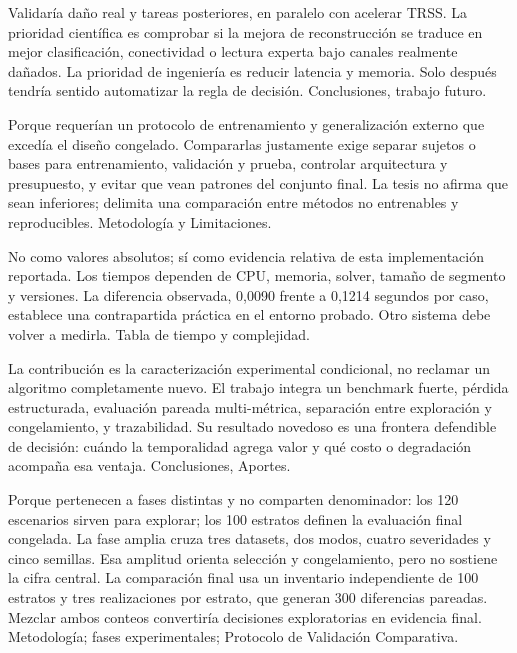 {Validaría daño real y tareas posteriores, en paralelo con acelerar TRSS.}
{La prioridad científica es comprobar si la mejora de reconstrucción se traduce en mejor clasificación, conectividad o lectura experta bajo canales realmente dañados. La prioridad de ingeniería es reducir latencia y memoria. Solo después tendría sentido automatizar la regla de decisión.}
{Conclusiones, trabajo futuro.}

{Porque requerían un protocolo de entrenamiento y generalización externo que excedía el diseño congelado.}
{Compararlas justamente exige separar sujetos o bases para entrenamiento, validación y prueba, controlar arquitectura y presupuesto, y evitar que vean patrones del conjunto final. La tesis no afirma que sean inferiores; delimita una comparación entre métodos no entrenables y reproducibles.}
{Metodología y Limitaciones.}

{No como valores absolutos; sí como evidencia relativa de esta implementación reportada.}
{Los tiempos dependen de CPU, memoria, solver, tamaño de segmento y versiones. La diferencia observada, 0,0090 frente a 0,1214 segundos por caso, establece una contrapartida práctica en el entorno probado. Otro sistema debe volver a medirla.}
{Tabla de tiempo y complejidad.}

{La contribución es la caracterización experimental condicional, no reclamar un algoritmo completamente nuevo.}
{El trabajo integra un benchmark fuerte, pérdida estructurada, evaluación pareada multi-métrica, separación entre exploración y congelamiento, y trazabilidad. Su resultado novedoso es una frontera defendible de decisión: cuándo la temporalidad agrega valor y qué costo o degradación acompaña esa ventaja.}
{Conclusiones, Aportes.}

{Porque pertenecen a fases distintas y no comparten denominador: los 120 escenarios sirven para explorar; los 100 estratos definen la evaluación final congelada.}
{La fase amplia cruza tres datasets, dos modos, cuatro severidades y cinco semillas. Esa amplitud orienta selección y congelamiento, pero no sostiene la cifra central. La comparación final usa un inventario independiente de 100 estratos y tres realizaciones por estrato, que generan 300 diferencias pareadas. Mezclar ambos conteos convertiría decisiones exploratorias en evidencia final.}
{Metodología; fases experimentales; Protocolo de Validación Comparativa.}


